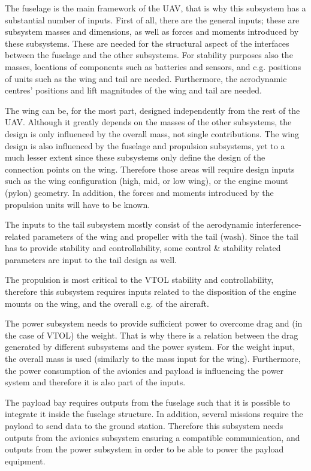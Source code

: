 
The fuselage is the main framework of the UAV, that is why this subsystem has a substantial number of inputs. First of all, there are the general inputs; these are subsystem masses and dimensions, as well as forces and moments introduced by these subsystems. These are needed for the structural aspect of the interfaces between the fuselage and the other subsystems. For stability purposes also the masses, locations of components such as batteries and sensors, and c.g. positions of units such as the wing and tail are needed. Furthermore, the aerodynamic centres' positions and lift magnitudes of the wing and tail are needed.  

The wing can be, for the most part, designed independently from the rest of the UAV. Although it greatly depends on the masses of the other subsystems, the design is only influenced by the overall mass, not single contributions. The wing design is also influenced by the fuselage and propulsion subsystems, yet to a much lesser extent since these subsystems only define the design of the connection points on the wing. Therefore those areas will require design inputs such as the wing configuration (high, mid, or low wing), or the  engine mount (pylon) geometry. In addition, the forces and moments introduced by the propulsion units will have to be known.

The inputs to the tail subsystem mostly consist of the aerodynamic interference-related parameters of the wing and propeller with the tail (wash). Since the tail has to provide stability and controllability, some control \& stability related parameters are input to the tail design as well.

The propulsion is most critical to the VTOL stability and controllability, therefore this subsystem requires inputs related to the disposition of the engine mounts on the wing, and the overall c.g. of the aircraft.

The power subsystem needs to provide sufficient power to overcome drag and (in the case of VTOL) the weight. That is why there is a relation between the drag generated by different subsystems and the power system. For the weight input, the overall mass is used (similarly to the mass input for the wing). Furthermore, the power consumption of the avionics and payload is influencing the power system and therefore it is also part of the inputs.

The payload bay requires outputs from the fuselage such that it is possible to integrate it inside the fuselage structure. In addition, several missions require the payload to send data to the ground station. Therefore this subsystem needs outputs from the avionics subsystem ensuring a compatible communication, and outputs from the power subsystem in order to be able to power the payload equipment.

